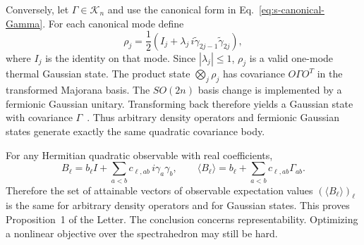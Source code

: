 \documentclass[10pt,aps,pra,twocolumn,superscriptaddress,nofootinbib,longbibliography]{revtex4-2}
\newcommand{\calK}{\mathcal{K}}
\begin{document}
{Conversely, let $\Gamma\in\calK_n$ and use the canonical form in Eq.~\eqref{eq:s-canonical-Gamma}.  For each canonical mode define
\begin{equation}
    \rho_j=\frac12\left(I_j+\lambda_j\,i\tilde\gamma_{2j-1}\tilde\gamma_{2j}\right),
    \label{eq:s-single-mode-gaussian}
\end{equation}
where $I_j$ is the identity on that mode.  Since $|\lambda_j|\le1$, $\rho_j$ is a valid one-mode thermal Gaussian state.  The product state $\bigotimes_j\rho_j$ has covariance $O\Gamma O^T$ in the transformed Majorana basis.  The $SO(2n)$ basis change is implemented by a fermionic Gaussian unitary.  Transforming back therefore yields a Gaussian state with covariance $\Gamma$~\cite{Bravyi2005Lagrangian,DiVincenzoTerhal2005FLO,Wan2023MatchgateShadows}.  Thus arbitrary density operators and fermionic Gaussian states generate exactly the same quadratic covariance body.

For any Hermitian quadratic observable with real coefficients,
\begin{equation}
  B_\ell=b_\ell I+\sum_{a<b}c_{\ell,ab}\,i\gamma_a\gamma_b,
  \qquad
  \langle B_\ell\rangle=b_\ell+\sum_{a<b}c_{\ell,ab}\Gamma_{ab}.
\end{equation}
Therefore the set of attainable vectors of observable expectation values $(\langle B_\ell\rangle)_\ell$ is the same for arbitrary density operators and for Gaussian states.  This proves Proposition~1 of the Letter.  The conclusion concerns representability.  Optimizing a nonlinear objective over the spectrahedron may still be hard.

}
\end{document}
